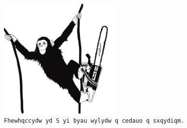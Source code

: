 \documentclass[11pt]{article}
\begin{document}
\begin{center}
  \includegraphics[width=0.45\textwidth]{../../images/monkey-chainsaw.jpg} \\
  \vspace{10pt}
  \texttt{Fhewhqccydw yd S yi byau wylydw q cedauo q sxqydiqm.}
\end{center}
\end{document}
